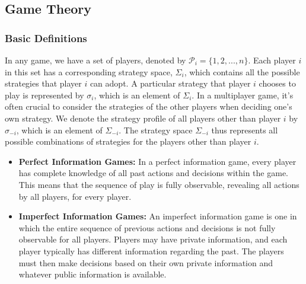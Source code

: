 \documentclass[11pt]{article}
\begin{document}

\subsection{Game Theory}
\subsubsection{Basic Definitions}
In any game, we have a set of players, denoted by $\mathcal{P}_i=\{1,2,...,n\}$. Each player $i$ in this set has a corresponding strategy space, $\Sigma_i$, which contains all the possible strategies that player $i$ can adopt. A particular strategy that player $i$ chooses to play is represented by $\sigma_i$, which is an element of $\Sigma_i$.
In a multiplayer game, it's often crucial to consider the strategies of the other players when deciding one's own strategy. We denote the strategy profile of all players other than player $i$ by $\sigma_{-i}$, which is an element of $\Sigma_{-i}$. The strategy space $\Sigma_{-i}$ thus represents all possible combinations of strategies for the players other than player $i$.
\begin{itemize}
  \item \textbf{Perfect Information Games:} In a perfect information game, every player has complete knowledge of all past actions and decisions within the game. This means that the sequence of play is fully observable, revealing all actions by all players, for every player.
  \item \textbf{Imperfect Information Games:} An imperfect information game is one in which the entire sequence of previous actions and decisions is not fully observable for all players. Players may have private information, and each player typically has different information regarding the past. The players must then make decisions based on their own private information and whatever public information is available.
  \end{itemize}
\end{document}
